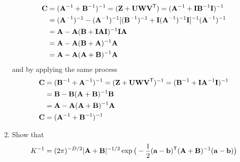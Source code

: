 \documentclass{amsmlaj}
\begin{document}
\begin{problem}
\begin{enumerate}
	\begin{equation}
		\begin{split}
			\vt{C}&=(\vt{A}^{-1}+\vt{B}^{-1})^{-1}
			=(\vt{Z}+\vt{U}\vt{W}\vt{V}^\trans)
			=(\vt{A}^{-1}+\vt{I}\vt{B}^{-1}\vt{I})^{-1} \\
			&=(\vt{A}^{-1})^{-1}-(\vt{A}^{-1})^{-1}[(\vt{B}^{-1})^{-1}
			+\vt{I}(\vt{A}^{-1})^{-1}\vt{I}]^{-1}(\vt{A}^{-1})^{-1} \\
			&=\vt{A}-\vt{A}(\vt{B}+\vt{I}\vt{A}\vt{I})^{-1}\vt{I}\vt{A} \\
			&=\vt{A}-\vt{A}(\vt{B}+\vt{A})^{-1}\vt{A} \\
			&=\vt{A}-\vt{A}(\vt{A}+\vt{B})^{-1}\vt{A}
		\end{split}
	\end{equation}
	and by applying the same process
	\begin{equation}
		\begin{split}
			\vt{C}&=(\vt{B}^{-1}+\vt{A}^{-1})^{-1}
			=(\vt{Z}+\vt{U}\vt{W}\vt{V}^\trans)^{-1}
			=(\vt{B}^{-1}+\vt{I}\vt{A}^{-1}\vt{I})^{-1} \\
			&=\vt{B}-\vt{B}(\vt{A}+\vt{B})^{-1}\vt{B} \\
			&=\vt{A}-\vt{A}(\vt{A}+\vt{B})^{-1}\vt{A} \\
			\vt{C}&=(\vt{A}^{-1}+\vt{B}^{-1})^{-1}
		\end{split}
	\end{equation}

\item Show that
				\begin{equation}
								K^{-1} = (2\pi)^{-D/2}|\vt{A}+\vt{B}|^{-1/2}
								\exp\big( -\frac{1}{2}(\vt{a}-\vt{b})^\trans
								(\vt{A}+\vt{B})^{-1} (\vt{a}-\vt{b})\big)
				\end{equation}
\end{enumerate}
\end{problem}
\end{document}

